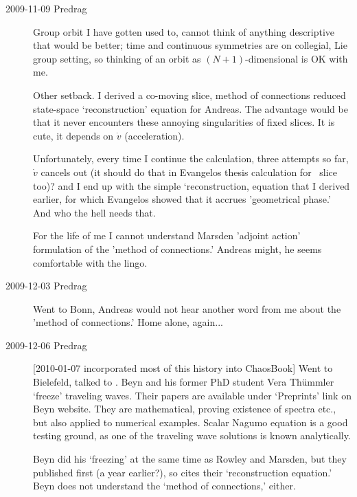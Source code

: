 \begin{description}
\item[2009-11-09 Predrag]
Group orbit I have gotten used to, cannot think of anything descriptive that would be better;
time and continuous symmetries are on collegial, Lie group setting, so thinking of an orbit as
$(N+1)$-dimensional is OK with me.

Other setback. I derived a co-moving slice, method of
connections reduced state-space `reconstruction' equation for
Andreas. The advantage would be that it never encounters these
annoying singularities of fixed slices. It is cute, it depends
on $\dot{v}$ (acceleration).

Unfortunately, every time I continue the calculation, three
attempts so far, $\dot{v}$ cancels out (it should do that in
Evangelos thesis calculation for \reqv\ slice too)? and I end
up with the simple `reconstruction, equation that I derived
earlier, for which Evangelos showed that it accrues
'geometrical phase.' And who the hell needs that.

For the life of me I cannot understand Marsden 'adjoint action'
formulation of the 'method of connections.' Andreas might, he
seems comfortable with the lingo.

\item[2009-12-03 Predrag] Went to Bonn, Andreas would not hear
another word from me about the 'method of connections.' Home
alone, again...

\renewcommand{\LieEl}{\ensuremath{g}}  %
\renewcommand{\gSpace}{\ensuremath{\theta}}   %
\renewcommand{\ssp}{x}

\item[2009-12-06 Predrag]
[2010-01-07 incorporated most of this history into ChaosBook]
Went to Bielefeld, talked to
.
Beyn and his former PhD student Vera
Th\"ummler `freeze' traveling waves. Their
papers are available under `Preprints' link on Beyn website.
They are mathematical, proving existence of spectra etc., but
also applied to numerical examples. Scalar Nagumo equation is a
good testing ground, as one of the traveling wave solutions is
known analytically.

Beyn did his `freezing' at the same time as Rowley and
Marsden, but they published first (a
year earlier?), so  cites their `reconstruction
equation.' Beyn does not understand the `method of
connections,' either.


\end{description}
